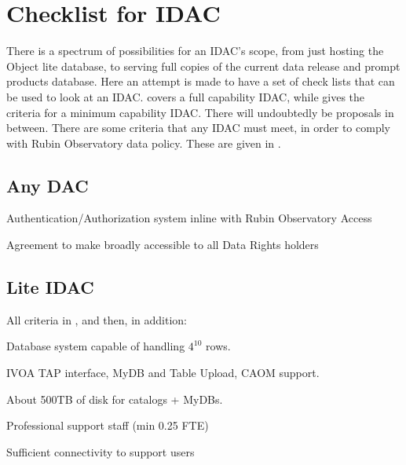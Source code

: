 
\section{Checklist for IDAC}\label{sec:checklist}

There is a spectrum of possibilities for an IDAC's scope, from just hosting the Object lite database, to serving full copies of the current data release and prompt products database.
Here an attempt is made to have a set of check lists  that can be used to look at an IDAC.
 covers a full capability IDAC, while   gives the criteria for a minimum capability IDAC.
There will undoubtedly be proposals in between. There are some criteria that any IDAC must meet, in order to comply with Rubin Observatory data policy. These are given in .

\subsection{Any DAC} \label{sec:anyDAC}
\begin{todolist}
\item Authentication/Authorization system  inline with Rubin Observatory Access
\item Agreement to make broadly accessible to all Data Rights holders
\end{todolist}

\subsection{Lite IDAC} \label{sec:liteDAC}
All criteria in , and then, in addition:
\begin{todolist}
\item Database system capable of handling $4^{10}$ rows.
\item IVOA TAP interface, MyDB and Table Upload, CAOM support.
\item About 500TB of disk for catalogs + MyDBs.
\item Professional support staff (min 0.25 FTE)
\item Sufficient connectivity to support users
\end{todolist}

